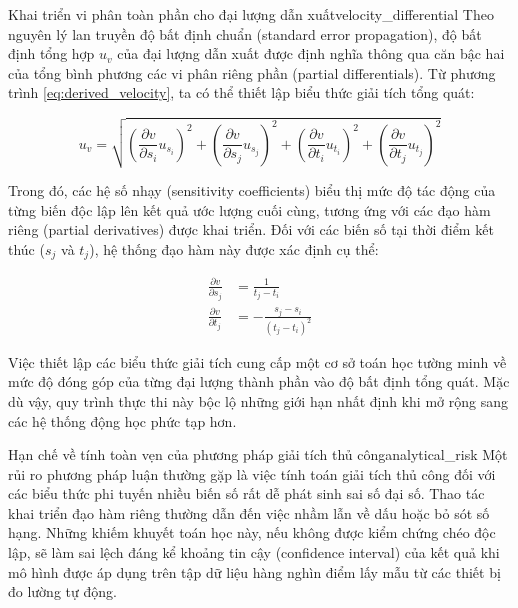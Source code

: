\begin{derivation}{Khai triển vi phân toàn phần cho đại lượng dẫn xuất}{velocity_differential}
Theo nguyên lý lan truyền độ bất định chuẩn (standard error propagation), độ bất định tổng hợp $u_v$ của đại lượng dẫn xuất được định nghĩa thông qua căn bậc hai của tổng bình phương các vi phân riêng phần (partial differentials). Từ phương trình \ref{eq:derived_velocity}, ta có thể thiết lập biểu thức giải tích tổng quát:

\begin{equation}
    u_v = \sqrt{ \left( \frac{\partial v}{\partial s_i} u_{s_i} \right)^2 + \left( \frac{\partial v}{\partial s_j} u_{s_j} \right)^2 + \left( \frac{\partial v}{\partial t_i} u_{t_i} \right)^2 + \left( \frac{\partial v}{\partial t_j} u_{t_j} \right)^2 }
    \label{eq:velocity_uncertainty}
\end{equation}

Trong đó, các hệ số nhạy (sensitivity coefficients) biểu thị mức độ tác động của từng biến độc lập lên kết quả ước lượng cuối cùng, tương ứng với các đạo hàm riêng (partial derivatives) được khai triển. Đối với các biến số tại thời điểm kết thúc ($s_j$ và $t_j$), hệ thống đạo hàm này được xác định cụ thể:

\begin{align}
    \frac{\partial v}{\partial s_j} &= \frac{1}{t_j - t_i} \label{eq:partial_sj} \\
    \frac{\partial v}{\partial t_j} &= - \frac{s_j - s_i}{(t_j - t_i)^2} \label{eq:partial_tj}
\end{align}
\end{derivation}

Việc thiết lập các biểu thức giải tích cung cấp một cơ sở toán học tường minh về mức độ đóng góp của từng đại lượng thành phần vào độ bất định tổng quát. Mặc dù vậy, quy trình thực thi này bộc lộ những giới hạn nhất định khi mở rộng sang các hệ thống động học phức tạp hơn.

\begin{pitfall}{Hạn chế về tính toàn vẹn của phương pháp giải tích thủ công}{analytical_risk}
Một rủi ro phương pháp luận thường gặp là việc tính toán giải tích thủ công đối với các biểu thức phi tuyến nhiều biến số rất dễ phát sinh sai số đại số. Thao tác khai triển đạo hàm riêng thường dẫn đến việc nhầm lẫn về dấu hoặc bỏ sót số hạng. Những khiếm khuyết toán học này, nếu không được kiểm chứng chéo độc lập, sẽ làm sai lệch đáng kể khoảng tin cậy (confidence interval) của kết quả khi mô hình được áp dụng trên tập dữ liệu hàng nghìn điểm lấy mẫu từ các thiết bị đo lường tự động.
\end{pitfall}

